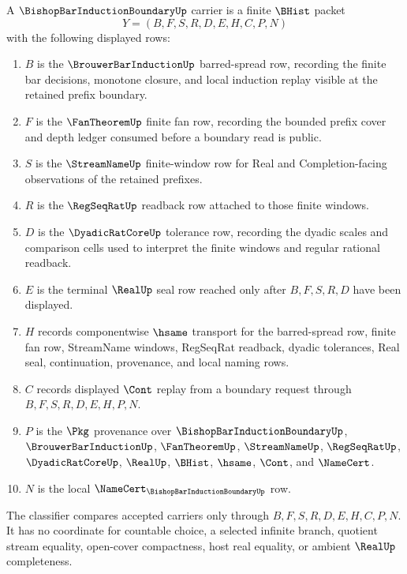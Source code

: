 \begin{definition}
\label{def:bishop-bar-induction-boundary-carrier}
A $\BishopBarInductionBoundaryUp$ carrier is a finite $\BHist$ packet
$$
Y=(B,F,S,R,D,E,H,C,P,N)
$$
with the following displayed rows:
\begin{enumerate}
\item $B$ is the $\BrouwerBarInductionUp$ barred-spread row, recording the finite bar decisions, monotone closure, and local induction replay visible at the retained prefix boundary.
\item $F$ is the $\FanTheoremUp$ finite fan row, recording the bounded prefix cover and depth ledger consumed before a boundary read is public.
\item $S$ is the $\StreamNameUp$ finite-window row for Real and Completion-facing observations of the retained prefixes.
\item $R$ is the $\RegSeqRatUp$ readback row attached to those finite windows.
\item $D$ is the $\DyadicRatCoreUp$ tolerance row, recording the dyadic scales and comparison cells used to interpret the finite windows and regular rational readback.
\item $E$ is the terminal $\RealUp$ seal row reached only after $B,F,S,R,D$ have been displayed.
\item $H$ records componentwise $\hsame$ transport for the barred-spread row, finite fan row, StreamName windows, RegSeqRat readback, dyadic tolerances, Real seal, continuation, provenance, and local naming rows.
\item $C$ records displayed $\Cont$ replay from a boundary request through $B,F,S,R,D,E,H,P,N$.
\item $P$ is the $\Pkg$ provenance over $\BishopBarInductionBoundaryUp$, $\BrouwerBarInductionUp$, $\FanTheoremUp$, $\StreamNameUp$, $\RegSeqRatUp$, $\DyadicRatCoreUp$, $\RealUp$, $\BHist$, $\hsame$, $\Cont$, and $\NameCert$.
\item $N$ is the local $\NameCert_{\BishopBarInductionBoundaryUp}$ row.
\end{enumerate}
The classifier compares accepted carriers only through $B,F,S,R,D,E,H,C,P,N$. It has no coordinate for countable choice, a selected infinite branch, quotient stream equality, open-cover compactness, host real equality, or ambient $\RealUp$ completeness.
\end{definition}

